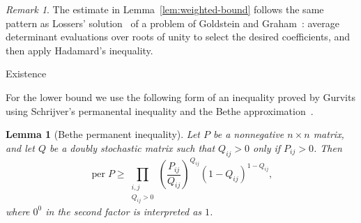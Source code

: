 \documentclass[11pt]{amsart}
\makeatletter
\def\subsection{\@startsection{subsection}{2}%
  \z@{1.05\linespacing\@plus.5\linespacing}{.4\linespacing}%
  {\normalfont\large\bfseries\raggedright}}
\newtheorem{lemma}[theorem]{Lemma}
\theoremstyle{remark}
\newtheorem*{remark}{Remark}
\newcommand{\per}{\operatorname{per}}
\makeatother
\begin{document}
\begin{remark}
The estimate in Lemma~\ref{lem:weighted-bound} follows the same pattern
as Lossers' solution~\cite{Lossers} of a problem of Goldstein and
Graham~\cite{GoldsteinGraham}: average determinant evaluations over
roots of unity to select the desired coefficients, and then apply
Hadamard's inequality.
\end{remark}

\subsection{Existence}

For the lower bound we use the following form of an inequality proved
by Gurvits using Schrijver's permanental inequality and the Bethe
approximation~\cite{GurvitsBethe}.

\begin{lemma}[Bethe permanent inequality]\label{lem:bethe}
Let $P$ be a nonnegative $n\times n$ matrix, and let $Q$ be a doubly
stochastic matrix such that $Q_{ij}>0$ only if $P_{ij}>0$.  Then
\[
  \per P
  \ge
  \prod_{\substack{i,j\\Q_{ij}>0}}
  \left(\frac{P_{ij}}{Q_{ij}}\right)^{Q_{ij}}
  (1-Q_{ij})^{1-Q_{ij}},
\]
where $0^0$ in the second factor is interpreted as $1$.
\end{lemma}
\end{document}
